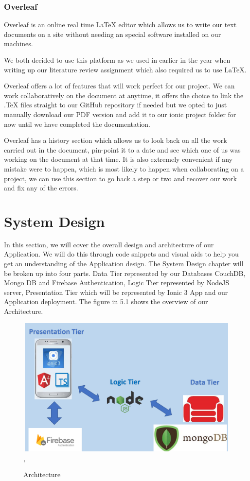\documentclass[12pt,a4paper,oneside,openany]{book}
\begin{document}
\subsection{Overleaf}
Overleaf is an online real time LaTeX editor which allows us to write our text documents on a site without needing an special software installed on our machines. 

We both decided to use this platform as we used in earlier in the year when writing up  our literature review assignment which also required us to use LaTeX. 

Overleaf offers a lot of features that will work perfect for our project. We can work collaboratively on the document at anytime, it offers the choice to link the .TeX files straight to our GitHub repository if needed but we opted to just manually download our PDF version and add it to our ionic project folder for now until we have completed the documentation.

Overleaf has a history section which allows us to look back on all the work carried out in the document, pin-point it to a date and see which one of us was working on the document at that time. It is also extremely convenient if any mistake were to happen, which is most likely to happen when collaborating on a project, we can use this section to go back a step or two and recover our work and fix any of the errors.

\chapter{System Design}
In this section, we will cover the overall design and architecture of our Application. We will do this through code snippets and visual aids to help you get an understanding of the Application design. The System Design chapter will be broken up into four parts. Data Tier represented by our Databases CouchDB, Mongo DB and Firebase Authentication, Logic Tier represented by NodeJS server, Presentation Tier which will be represented by Ionic 3 App and our Application deployment. The figure in 5.1 shows the overview of our Architecture.

\begin{figure}[ht]
\renewcommand\thefigure{5.1}
\centering
\includegraphics[width=13cm,height=7cm]{Images/architecture.png},
\caption{Architecture}
\label{Architecture}
\end{figure}
\end{document}
